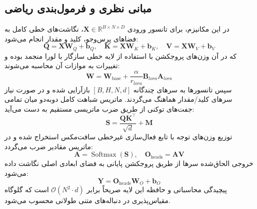 \subsection{مبانی نظری و فرمول‌بندی ریاضی}
در این مکانیزم، برای تانسور ورودی $\mathbf{X} \in \mathbb{R}^{B \times N \times D}$، نگاشت‌های خطی کامل به فضاهای پرس‌وجو، کلید و مقدار انجام می‌شود:
\begin{equation}
\mathbf{Q} = \mathbf{X} \mathbf{W}_Q + \mathbf{b}_Q, \quad \mathbf{K} = \mathbf{X} \mathbf{W}_K + \mathbf{b}_K, \quad \mathbf{V} = \mathbf{X} \mathbf{W}_V + \mathbf{b}_V
\end{equation}
که در آن وزن‌های پروجکشن با استفاده از لایه خطی سازگار با لورا منجمد بوده و تغییرات به موازات آن محاسبه می‌شوند:
\begin{equation}
\mathbf{W} = \mathbf{W}_{\text{base}} + \frac{\alpha}{r_{lora}} \mathbf{B}_{lora} \mathbf{A}_{lora}
\end{equation}
سپس تانسورها به سرهای چندگانه $[B, H, N, d]$ بازآرایی شده و در صورت نیاز سرهای کلید/مقدار هماهنگ می‌گردند. ماتریس شباهت کامل دو‌به‌دو میان تمامی جفت‌های توکنی از طریق ضرب ماتریسی مستقیم به دست می‌آید:
\begin{equation}
\mathbf{S} = \frac{\mathbf{Q} \mathbf{K}^\top}{\sqrt{d}} + \mathbf{M}
\end{equation}
توزیع وزن‌های توجه با تابع فعال‌سازی غیرخطی سافت‌مکس استخراج شده و در ماتریس مقادیر ضرب می‌گردد:
\begin{equation}
\mathbf{A} = \operatorname{Softmax}(\mathbf{S}), \quad \mathbf{O}_{\text{heads}} = \mathbf{A} \mathbf{V}
\end{equation}
خروجی الحاق‌شده سرها از طریق پروجکشن پایانی به فضای ابعادی اصلی نگاشت داده می‌شود:
\begin{equation}
\mathbf{Y} = \mathbf{O}_{\text{heads}} \mathbf{W}_O + \mathbf{b}_O
\end{equation}
پیچیدگی محاسباتی و حافظه این لایه صریحاً برابر $\mathcal{O}(N^2 \cdot d)$ است که گلوگاه مقیاس‌پذیری در دنباله‌های متنی طولانی محسوب می‌شود.

